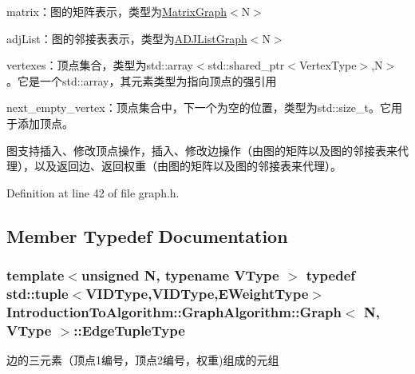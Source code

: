 \begin{DoxyItemize}
\item {\ttfamily matrix}：图的矩阵表示，类型为{\ttfamily \hyperlink{struct_introduction_to_algorithm_1_1_graph_algorithm_1_1_matrix_graph}{Matrix\+Graph}$<$N$>$}
\item {\ttfamily adj\+List}：图的邻接表表示，类型为{\ttfamily \hyperlink{struct_introduction_to_algorithm_1_1_graph_algorithm_1_1_a_d_j_list_graph}{A\+D\+J\+List\+Graph}$<$N$>$}
\item {\ttfamily vertexes}：顶点集合，类型为{\ttfamily std\+::array$<$std\+::shared\+\_\+ptr$<$Vertex\+Type$>$,N$>$}。它是一个{\ttfamily std\+::array}，其元素类型为指向顶点的强引用
\item {\ttfamily next\+\_\+empty\+\_\+vertex}：顶点集合中，下一个为空的位置，类型为{\ttfamily std\+::size\+\_\+t}。它用于添加顶点。
\end{DoxyItemize}

图支持插入、修改顶点操作，插入、修改边操作（由图的矩阵以及图的邻接表来代理），以及返回边、返回权重（由图的矩阵以及图的邻接表来代理）。 

Definition at line 42 of file graph.\+h.



\subsection{Member Typedef Documentation}
\hypertarget{struct_introduction_to_algorithm_1_1_graph_algorithm_1_1_graph_ad1eb485d135eb8076a44b00904ae2f5a}{}
\subsubsection[{Edge\+Tuple\+Type}]{\setlength{\rightskip}{0pt plus 5cm}template$<$unsigned N, typename V\+Type $>$ typedef std\+::tuple$<${\bf V\+I\+D\+Type},{\bf V\+I\+D\+Type},{\bf E\+Weight\+Type}$>$ {\bf Introduction\+To\+Algorithm\+::\+Graph\+Algorithm\+::\+Graph}$<$ N, V\+Type $>$\+::{\bf Edge\+Tuple\+Type}}\label{struct_introduction_to_algorithm_1_1_graph_algorithm_1_1_graph_ad1eb485d135eb8076a44b00904ae2f5a}
边的三元素（顶点1编号，顶点2编号，权重)组成的元组 

